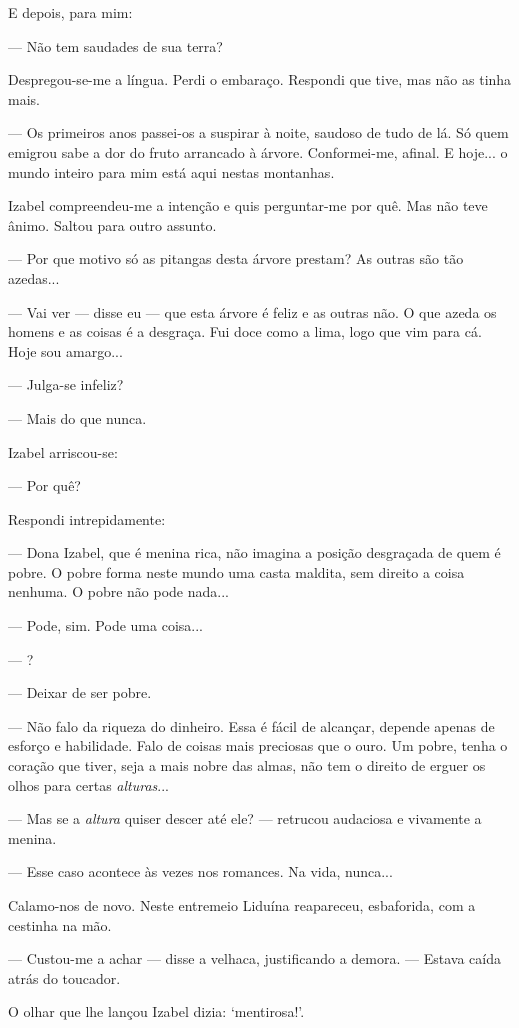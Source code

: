 E depois, para mim:

--- Não tem saudades de sua terra?

Despregou-se-me a língua. Perdi o embaraço. Respondi que tive, mas não
as tinha mais.

--- Os primeiros anos passei-os a suspirar à noite, saudoso de tudo de
lá. Só quem emigrou sabe a dor do fruto arrancado à árvore.
Conformei-me, afinal. E hoje... o mundo inteiro para mim está aqui
nestas montanhas.

Izabel compreendeu-me a intenção e quis perguntar-me por quê. Mas não
teve ânimo. Saltou para outro assunto.

--- Por que motivo só as pitangas desta árvore prestam? As outras são
tão azedas...

--- Vai ver --- disse eu --- que esta árvore é feliz e as outras não. O
que azeda os homens e as coisas é a desgraça. Fui doce como a lima, logo
que vim para cá. Hoje sou amargo...

--- Julga-se infeliz?

--- Mais do que nunca.

Izabel arriscou-se:

--- Por quê?

Respondi intrepidamente:

--- Dona Izabel, que é menina rica, não imagina a posição desgraçada de
quem é pobre. O pobre forma neste mundo uma casta maldita, sem direito a
coisa nenhuma. O pobre não pode nada...

--- Pode, sim. Pode uma coisa...

--- ?

--- Deixar de ser pobre.

--- Não falo da riqueza do dinheiro. Essa é fácil de alcançar, depende
apenas de esforço e habilidade. Falo de coisas mais preciosas que o
ouro. Um pobre, tenha o coração que tiver, seja a mais nobre das almas,
não tem o direito de erguer os olhos para certas \emph{alturas}...

--- Mas se a \emph{altura} quiser descer até ele? --- retrucou audaciosa
e vivamente a menina.

--- Esse caso acontece às vezes nos romances. Na vida, nunca...

Calamo-nos de novo. Neste entremeio Liduína reapareceu, esbaforida, com
a cestinha na mão.

--- Custou-me a achar --- disse a velhaca, justificando a demora. ---
Estava caída atrás do toucador.

O olhar que lhe lançou Izabel dizia: `mentirosa!'.

